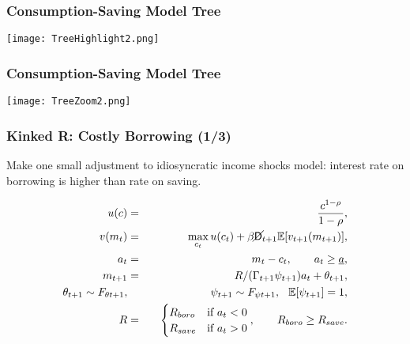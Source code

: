 \documentclass[11ptt]{beamer}
\newcommand{\E}{\mathbb{E}}
\newcommand{\Die}{\mathsf{D}}
\newcommand{\Live}{\cancel{\Die}}
\begin{document}
\begin{frame}\label{Recombination}
\frametitle{Consumption-Saving Model Tree}
\begin{center}
\texttt{[image: TreeHighlight2.png]}
\end{center}
\end{frame}

\begin{frame}
\frametitle{Consumption-Saving Model Tree}
\begin{center}
\texttt{[image: TreeZoom2.png]}
\end{center}
\end{frame}


\begin{frame}
\frametitle{Kinked R: Costly Borrowing (1/3)}
Make one small adjustment to idiosyncratic income shocks model: interest rate on borrowing is higher than rate on saving.

\begin{eqnarray*}
u(c) &=& \frac{c^{1-\rho}}{1-\rho}, \\
v(m_t) &=& \max_{c_t} u(c_t) + \beta \Live_{t+1} \E [v_{t+1}(m_{t+1}) ], \\
a_t &=& m_t - c_t, \qquad a_t \geq \underline{a}, \\
m_{t+1} &=& R/(\Gamma_{t+1} \psi_{t+1}) a_t + \theta_{t+1}, \\
\theta_{t+1} \sim F_{\theta t+1}, &\qquad& \psi_{t+1} \sim F_{\psi t+1}, \hspace{0.25cm} \E[\psi_{t+1}] = 1, \\
R &=& \begin{cases}
R_{boro} & \text{if  } a_t < 0 \\
R_{save} & \text{if  } a_t > 0
\end{cases}, \qquad R_{boro} \geq R_{save}.
\end{eqnarray*}
\end{frame}
\end{document}

